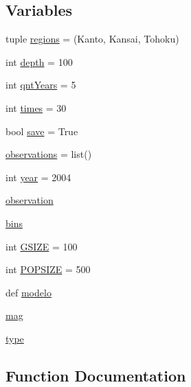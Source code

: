 \subsection*{Variables}
\begin{DoxyCompactItemize}
\item 
tuple \hyperlink{namespacecode_1_1third_try_a23aaf2dc4418713dc1000ce54b649091}{regions} = (\textquotesingle{}Kanto\textquotesingle{}, \textquotesingle{}Kansai\textquotesingle{}, \textquotesingle{}Tohoku\textquotesingle{})
\item 
int \hyperlink{namespacecode_1_1third_try_a8ef5d016b8d3671a31729ee874cf3ecc}{depth} = 100
\item 
int \hyperlink{namespacecode_1_1third_try_ad9fd7686f220b53ca791814fd02c2cce}{qnt\+Years} = 5
\item 
int \hyperlink{namespacecode_1_1third_try_afb1133f9e67dabc626cce7f7ef90025c}{times} = 30
\item 
bool \hyperlink{namespacecode_1_1third_try_a7525f4c8089eada879c9c85b6c9be14a}{save} = True
\item 
\hyperlink{namespacecode_1_1third_try_a085cfa54975ca52de2df7f0a8c3aba61}{observations} = list()
\item 
int \hyperlink{namespacecode_1_1third_try_a940c1383be044c2ae5f6e40411f9b0b4}{year} = 2004
\item 
\hyperlink{namespacecode_1_1third_try_adf92af06f00b952e7e9370bc2cacfad0}{observation}
\item 
\hyperlink{namespacecode_1_1third_try_a938927089deec1d93c458d0b42d6d334}{bins}
\item 
int \hyperlink{namespacecode_1_1third_try_a2c99b18acee0adb533663ac0b6d2866c}{G\+S\+I\+ZE} = 100
\item 
int \hyperlink{namespacecode_1_1third_try_af536d014156756dc7a67ad6bd1d9328f}{P\+O\+P\+S\+I\+ZE} = 500
\item 
def \hyperlink{namespacecode_1_1third_try_a505ce9eb60ad0a14e34a120f9f2db094}{modelo}
\item 
\hyperlink{namespacecode_1_1third_try_abb425c5c5c595fa9c1e2d87effd2d5cb}{mag}
\item 
\hyperlink{namespacecode_1_1third_try_a1ae3ab93a76d7a052d7e23967c234e8d}{type}
\end{DoxyCompactItemize}


\subsection{Function Documentation}
\mbox{\label{namespacecode_1_1third_try_a3d84fdf17250c9c0b1547c5c545f6c5b}} 
